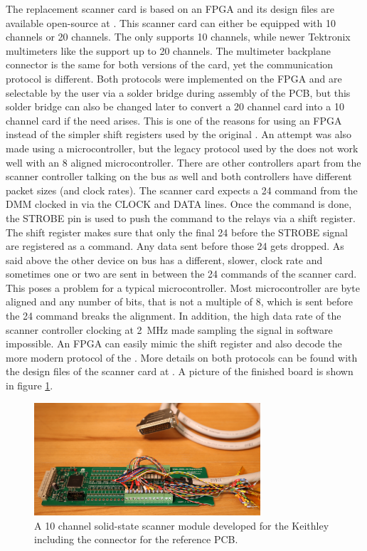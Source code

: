 The replacement scanner card is based on an  FPGA and its design files are available open-source at \cite{git_scan2000}. This scanner card can either be equipped with \num{10} channels or \num{20} channels. The  only supports \num{10} channels, while newer Tektronix multimeters like the  support up to \num{20} channels. The multimeter backplane connector is the same for both versions of the card, yet the communication protocol is different. Both protocols were implemented on the FPGA and are selectable by the user via a solder bridge during assembly of the PCB, but this solder bridge can also be changed later to convert a \num{20} channel card into a \num{10} channel card if the need arises. This is one of the reasons for using an FPGA instead of the simpler shift registers used by the original . An attempt was also made using a microcontroller, but the legacy protocol used by the  does not work well with an \qty{8}{\bit} aligned microcontroller. There are other controllers apart from the scanner controller talking on the bus as well and both controllers have different packet sizes (and clock rates). The scanner card expects a \qty{24}{\bit} command from the DMM clocked in via the CLOCK and DATA lines. Once the command is done, the STROBE pin is used to push the command to the relays via a shift register. The shift register makes sure that only the final \qty{24}{\bit} before the STROBE signal are registered as a command. Any data sent before those \qty{24}{\bit} gets dropped. As said above the other device on bus has a different, slower, clock rate and sometimes one or two \unit{\bit} are sent in between the \qty{24}{\bit} commands of the scanner card. This poses a problem for a typical microcontroller. Most microcontroller are byte aligned and any number of bits, that is not a multiple of \num{8}, which is sent before the \qty{24}{\bit} command breaks the alignment. In addition, the high data rate of the scanner controller clocking at \qty{2}{\MHz} made sampling the signal in software impossible. An FPGA can easily mimic the shift register and also decode the more modern protocol of the . More details on both protocols can be found with the design files of the scanner card at \cite{git_scan2000}. A picture of the finished board is shown in figure \ref{fig:scan200_pcb}.
\begin{figure}[h]
    \centering
    \includegraphics[width=0.75\textwidth]{images/BM1A2145_SCAN2000_lowres.JPG}
    \caption{A \num{10} channel solid-state scanner module developed for the Keithley  including the connector for the reference PCB.}
    \label{fig:scan200_pcb}
\end{figure}

